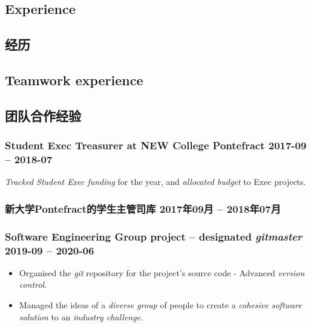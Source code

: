 \begin{xen}
\section{Experience}
\end{xen}
\begin{xcn}
\section{经历}
\end{xcn}
\begin{xen}
    \subsection{Teamwork experience}
\end{xen}
\begin{xcn}
    \subsection{团队合作经验}
\end{xcn}
\begin{xen}
        \subsubsection{Student Exec Treasurer at NEW College Pontefract
        \hfill 2017-09 -- 2018-07}
                \emph{Tracked Student Exec funding} for the year, and
                \emph{allocated budget} to Exec projects.
\end{xen}
\begin{xcn}
        \subsubsection{新大学Pontefract的学生主管司库 %
        \hfill 2017年09月 -- 2018年07月}
\end{xcn}
\begin{xen}
        \subsubsection{Software Engineering Group project -- designated \emph{gitmaster}
        \hfill 2019-09 -- 2020-06}
            \begin{itemize}
                \item Organised the \emph{git} repository for the project's
                    source code - Advanced \emph{version control}.
                \item Managed the ideas of a \emph{diverse group} of people to
                    create a \emph{cohesive software solution} to an
                    \emph{industry challenge}.
            \end{itemize}
\end{xen}
